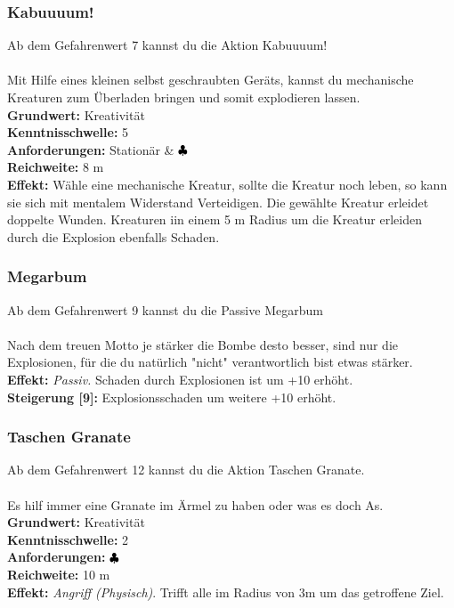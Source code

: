 \subsubsection*{ Kabuuuum!} \label{sk:kabuuuum!}
Ab dem Gefahrenwert 7 kannst du die Aktion Kabuuuum! \\
\\
Mit Hilfe eines kleinen selbst geschraubten Geräts, kannst du mechanische Kreaturen zum Überladen bringen und somit explodieren lassen.\\
\textbf{Grundwert:} Kreativität \\
\textbf{Kenntnisschwelle:} 5 \\
\textbf{Anforderungen:} Stationär \& ${\color{blue} }{\color{black}\clubsuit}$ \\
\textbf{Reichweite:} 8 m \\
\textbf{Effekt:} Wähle eine mechanische Kreatur, sollte die Kreatur noch leben, so kann sie sich mit mentalem Widerstand Verteidigen. Die gewählte Kreatur erleidet doppelte Wunden. Kreaturen iin einem 5 m Radius um die Kreatur erleiden durch die Explosion ebenfalls Schaden.  

\subsubsection*{ Megarbum} \label{sk:megarbum}
Ab dem Gefahrenwert 9 kannst du die Passive Megarbum \\
\\
Nach dem treuen Motto je stärker die Bombe desto besser, sind nur die Explosionen, für die du natürlich "nicht" verantwortlich bist etwas stärker. \\
\textbf{Effekt:} \textit{Passiv.} Schaden durch Explosionen ist um +10 erhöht.\\
\textbf{Steigerung [9]:} Explosionsschaden um weitere +10 erhöht.

\subsubsection*{ Taschen Granate} \label{sk:taschengranate!}
Ab dem Gefahrenwert 12 kannst du die Aktion Taschen Granate. \\
\\
Es hilf immer eine Granate im Ärmel zu haben oder was es doch As.\\
\textbf{Grundwert:} Kreativität \\
\textbf{Kenntnisschwelle:} 2 \\
\textbf{Anforderungen:} ${\color{blue} }{\color{black}\clubsuit}$ \\
\textbf{Reichweite:} 10 m \\
\textbf{Effekt:} \textit{Angriff (Physisch)}. Trifft alle im Radius von 3m um das getroffene Ziel.

